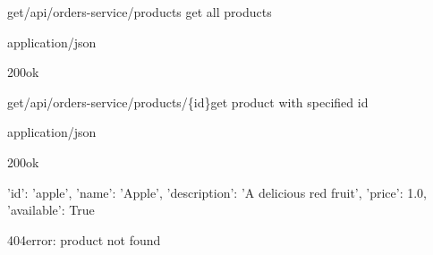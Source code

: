 \begin{apiRoute}{get}{/api/orders-service/products} {get all products}
	\begin{routeParameter}
	\end{routeParameter}
	\begin{routeResponse}{application/json}
		\begin{routeResponseItem}{200}{ok}
			\begin{routeResponseItemBody}
			\end{routeResponseItemBody}
		\end{routeResponseItem}
	\end{routeResponse}
\end{apiRoute}

\begin{apiRoute}{get}{/api/orders-service/products/\{id\}}{get product with specified id}
	\begin{routeParameter}
		\routeParamItem{id}{id of the product}
	\end{routeParameter}
	\begin{routeResponse}{application/json}
		\begin{routeResponseItem}{200}{ok}
			\begin{routeResponseItemBody}
{
    'id': 'apple',
    'name': 'Apple',
    'description': 'A delicious red fruit',
    'price': 1.0,
    'available': True
}
			\end{routeResponseItemBody}
		\end{routeResponseItem}
		\begin{routeResponseItem}{404}{error: product not found}
		    \begin{routeResponseItemBody}
			\end{routeResponseItemBody}
		\end{routeResponseItem}
	\end{routeResponse}
\end{apiRoute}

